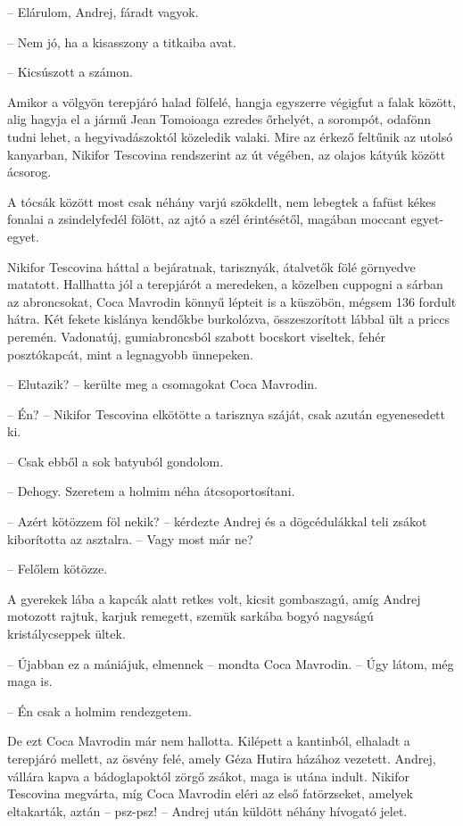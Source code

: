 \documentclass{IEEEtran}
\begin{document}
– Elárulom, Andrej, fáradt vagyok.

– Nem jó, ha a kisasszony a titkaiba avat.

– Kicsúszott a számon.

Amikor a völgyön terepjáró halad fölfelé, hangja egyszerre végigfut a falak
között, alig hagyja el a jármű Jean Tomoioaga ezredes őrhelyét, a sorompót,
odafönn tudni lehet, a hegyivadászoktól közeledik valaki. Mire az érkező
feltűnik az utolsó kanyarban, Nikifor Tescovina rendszerint az út végében, az
olajos kátyúk között ácsorog.

A tócsák között most csak néhány varjú szökdellt, nem lebegtek a fafüst kékes
fonalai a zsindelyfedél fölött, az ajtó a szél érintésétől, magában moccant
egyet-egyet.

Nikifor Tescovina háttal a bejáratnak, tarisznyák, átalvetők fölé görnyedve
matatott. Hallhatta jól a terepjárót a meredeken, a közelben cuppogni a sárban
az abroncsokat, Coca Mavrodin könnyű lépteit is a küszöbön, mégsem 136 fordult
hátra. Két fekete kislánya kendőkbe burkolózva, összeszorított lábbal ült a
priccs peremén. Vadonatúj, gumiabroncsból szabott bocskort viseltek, fehér
posztókapcát, mint a legnagyobb ünnepeken.

– Elutazik? – kerülte meg a csomagokat Coca Mavrodin.

– Én? – Nikifor Tescovina elkötötte a tarisznya száját, csak azután
egyenesedett ki.

– Csak ebből a sok batyuból gondolom.

– Dehogy. Szeretem a holmim néha átcsoportosítani.

– Azért kötözzem föl nekik? – kérdezte Andrej és a dögcédulákkal teli zsákot
kiborította az asztalra. – Vagy most már ne?

– Felőlem kötözze.

A gyerekek lába a kapcák alatt retkes volt, kicsit gombaszagú, amíg Andrej
motozott rajtuk, karjuk remegett, szemük sarkába bogyó nagyságú
kristálycseppek ültek.

– Újabban ez a mániájuk, elmennek – mondta Coca Mavrodin. – Úgy látom, még
maga is.

– Én csak a holmim rendezgetem.

De ezt Coca Mavrodin már nem hallotta. Kilépett a kantinból, elhaladt a
terepjáró mellett, az ösvény felé, amely Géza Hutira házához vezetett. Andrej,
vállára kapva a bádoglapoktól zörgő zsákot, maga is utána indult. Nikifor
Tescovina megvárta, míg Coca Mavrodin eléri az első fatörzseket, amelyek
eltakarták, aztán – psz-psz! – Andrej után küldött néhány hívogató jelet.
\end{document}
